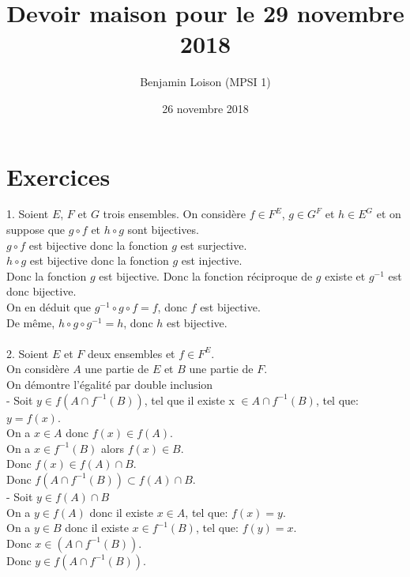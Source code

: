 \documentclass{article}
\begin{document}
	\title{\vspace{-1cm}Devoir maison pour le 29 novembre 2018}
	\author{Benjamin Loison (MPSI 1)}
	\date{26 novembre 2018}
	\maketitle

	\section{Exercices}
		
		1. Soient $E$, $F$ et $G$ trois ensembles. On considère $f \in F^E$, $g \in G^F$ et $h \in E^G$ et on suppose que $g \circ f$ et $h \circ g$ sont bijectives.\\
		$g \circ f$ est bijective donc la fonction $g$ est surjective.\\
		$h \circ g$ est bijective donc la fonction $g$ est injective.\\
		Donc la fonction $g$ est bijective. Donc la fonction réciproque de $g$ existe et $g^{-1}$ est donc bijective.\\
		On en déduit que $g^{-1} \circ g \circ f = f$, donc $f$ est bijective.\\
		De même, $h \circ g \circ g^{-1} = h$, donc $h$ est bijective.\\\\
		2. Soient $E$ et $F$ deux ensembles et $f \in F^E$.\\
		On considère $A$ une partie de $E$ et $B$ une partie de $F$.\\
		On démontre l'égalité par double inclusion\\
		- Soit $y \in f(A \cap f^{-1}(B))$, tel que il existe x $\in A \cap f^{-1}(B)$, tel que: $y=f(x)$.\\
		On a $x \in A$ donc $f(x) \in f(A)$.\\
		On a $x \in f^{-1}(B)$ alors $f(x) \in B$.\\
		Donc $f(x) \in f(A) \cap B$.\\
		Donc $f(A \cap f^{-1}(B)) \subset f(A) \cap B$.\\
		- Soit $y \in f(A) \cap B$\\
		On a $y \in f(A)$ donc il existe $x \in A$, tel que: $f(x)=y$.\\
		On a $y \in B$ donc il existe $x \in f^{-1}(B)$, tel que: $f(y)=x$.\\
		Donc $x \in (A \cap f^{-1}(B))$.\\
		Donc $y \in f(A \cap f^{-1}(B))$.\\
\end{document}
